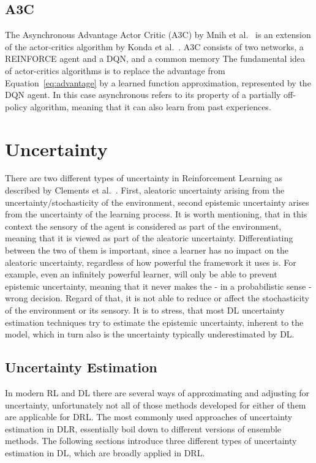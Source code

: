 \documentclass[11pt,a4paper]{article}
\begin{document}
	\subsection{A3C}\label{subsec:a3c}
	The Asynchronous Advantage Actor Critic (A3C) by Mnih et al.~\cite{mnih_asynchronous_2016} is an extension of the actor-critics algorithm by Konda et al.~\cite{konda_actor-critic_2000}.
	A3C consists of two networks, a REINFORCE agent and a DQN, and a common memory
	The fundamental idea of actor-critics algorithms is to replace the advantage from Equation~\ref{eq:advantage} by a learned function approximation, represented by the DQN agent.
	In this case asynchronous refers to its property of a partially off-policy algorithm, meaning that it can also learn from past experiences.

	\section{Uncertainty}\label{sec:uncertainty}
	There are two different types of uncertainty in Reinforcement Learning as described by Clements et al.~\cite{clements_estimating_2020}.
	First, aleatoric uncertainty arising from the uncertainty/stochasticity of the environment, second epistemic uncertainty arises from the uncertainty of the learning process.
	It is worth mentioning, that in this context the sensory of the agent is considered as part of the environment, meaning that it is viewed as part of the aleatoric uncertainty.
	Differentiating between the two of them is important, since a learner has no impact on the aleatoric uncertainty, regardless of how powerful the framework it uses is.
	For example, even an infinitely powerful learner, will only be able to prevent epistemic uncertainty, meaning that it never makes the - in a probabilistic sense - wrong decision.
	Regard of that, it is not able to reduce or affect the stochasticity of the environment or its sensory.
	It is to stress, that most DL uncertainty estimation techniques try to estimate the epistemic uncertainty, inherent to the model, which in turn also is the uncertainty typically underestimated by DL.\\

	\subsection{Uncertainty Estimation}\label{subsec:uncertainty-estimation}
	In modern RL and DL there are several ways of approximating and adjusting for uncertainty, unfortunately not all of those methods developed for either of them are applicable for DRL.
	The most commonly used approaches of uncertainty estimation in DLR, essentially boil down to different versions of ensemble methods.
	The following sections introduce three different types of uncertainty estimation in DL, which are broadly applied in DRL.\\
\end{document}
